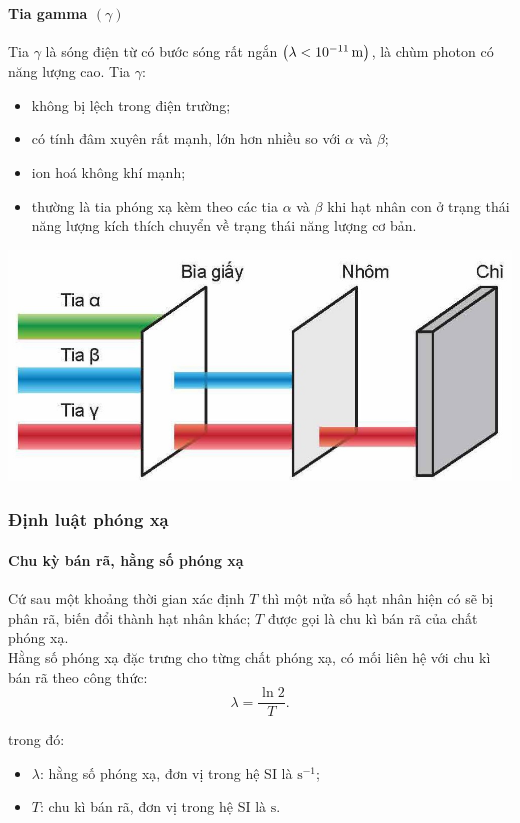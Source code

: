 \begin{tomtat}
	\paragraph{Tia gamma $\left(\gamma\right)$}
	Tia $\gamma$ là sóng điện từ có bước sóng rất ngắn $\left(\lambda<\SI{E-11}{\meter}\right)$, là chùm photon có năng lượng cao. Tia $\gamma$:
	\begin{itemize}
		\item không bị lệch trong điện trường;
		\item có tính đâm xuyên rất mạnh, lớn hơn nhiều so với $\alpha$ và $\beta$;
		\item ion hoá không khí mạnh;
		\item thường là tia phóng xạ kèm theo các tia $\alpha$ và $\beta$ khi hạt nhân con ở trạng thái năng lượng kích thích chuyển về trạng thái năng lượng cơ bản.
	\end{itemize}
	\begin{center}
		\includegraphics[width=0.5\linewidth]{figs/VN12-Y24-PH-SYL-031-4}
	\end{center}
	\subsubsection{Định luật phóng xạ}
	\paragraph{Chu kỳ bán rã, hằng số phóng xạ}
\begin{boxdl}
		Cứ sau một khoảng thời gian xác định $T$ thì một nửa số hạt nhân hiện có sẽ bị phân rã, biến đổi thành hạt nhân khác; $T$ được gọi là chu kì bán rã của chất phóng xạ.\\
	Hằng số phóng xạ đặc trưng cho từng chất phóng xạ, có mối liên hệ với chu kì bán rã theo công thức:
	\begin{equation}
		\lambda=\dfrac{\ln 2}{T}.
	\end{equation}
\end{boxdl}
	trong đó:
	\begin{itemize}
		\item $\lambda$: hằng số phóng xạ, đơn vị trong hệ SI là $\si{\second^{-1}}$;
		\item $T$: chu kì bán rã, đơn vị trong hệ SI là $\si{\second}$.
	\end{itemize}

\end{tomtat}
